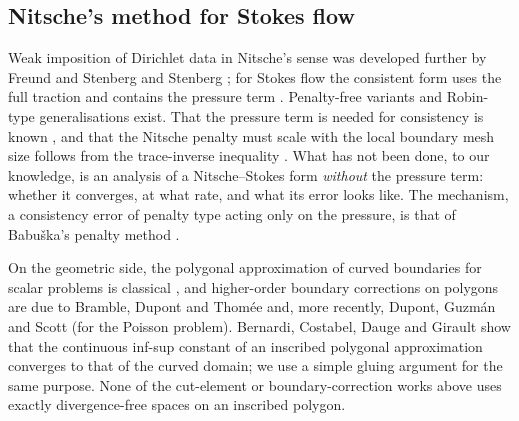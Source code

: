 \subsection{Nitsche's method for Stokes flow}
Weak imposition of Dirichlet data in Nitsche's sense was developed further by Freund and Stenberg \cite{FreundStenberg1995} and Stenberg \cite{Stenberg1995}; for Stokes flow the consistent form uses the full traction and contains the pressure term \cite{FreundStenberg1995,Stenberg1995,Becker2002,BurmanHansbo2014}. Penalty-free variants \cite{Burman2012,BoiveauBurman2016} and Robin-type generalisations \cite{JuntunenStenberg2009} exist. That the pressure term is needed for consistency is known \cite{BurmanHansboLarson2019Stokes}, and that the Nitsche penalty must scale with the local boundary mesh size follows from the trace-inverse inequality \cite{Stenberg1995,JuntunenStenberg2009}. What has not been done, to our knowledge, is an analysis of a Nitsche--Stokes form \emph{without} the pressure term: whether it converges, at what rate, and what its error looks like. The mechanism, a consistency error of penalty type acting only on the pressure, is that of Babu\v{s}ka's penalty method \cite{Babuska1973}.

On the geometric side, the polygonal approximation of curved boundaries for scalar problems is classical \cite{BergerScottStrang1972,Scott1975}, and higher-order boundary corrections on polygons are due to Bramble, Dupont and Thom\'ee \cite{BrambleDupontThomee1972} and, more recently, Dupont, Guzm\'an and Scott \cite{DupontGuzmanScott2025} (for the Poisson problem). Bernardi, Costabel, Dauge and Girault \cite{BCDG2016} show that the continuous inf-sup constant of an inscribed polygonal approximation converges to that of the curved domain; we use a simple gluing argument for the same purpose. None of the cut-element or boundary-correction works above uses exactly divergence-free spaces on an inscribed polygon.

